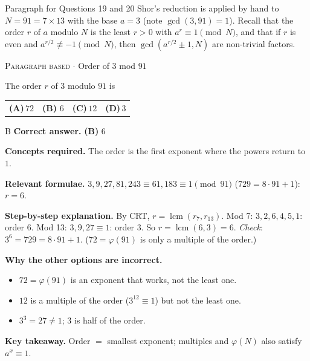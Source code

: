 \documentclass[11pt,a4paper]{article}
\newcommand{\optlabel}[1]{\textbf{(#1)}}
\newcommand{\correctlabel}[1]{\textcolor{okgreen}{\textbf{(#1)}\,\ding{51}}}
\newenvironment{qitem}[1]{\begin{list}{}{\setlength{\leftmargin}{3.3em}\setlength{\labelwidth}{3.1em}%
  \setlength{\labelsep}{0.2em}\setlength{\topsep}{3pt}\setlength{\parsep}{3pt}}\item[\textbf{Q.#1}\hfill]}{\end{list}}
\newcommand{\qsep}{\par\vspace{2pt}{\color{black!15}\hrule}\vspace{4pt}}
\newcommand{\qmeta}[2]{{\footnotesize\color{black!60}\textsc{#1} \;$\cdot$\; #2}\par}
\begin{document}
\begin{passagebox}{Paragraph for Questions 19 and 20}
Shor's reduction is applied by hand to $N = 91 = 7\times13$ with the base $a = 3$ (note $\gcd(3, 91) = 1$). Recall that the
order $r$ of $a$ modulo $N$ is the least $r > 0$ with $a^r \equiv 1 \pmod N$, and that if $r$ is even and $a^{r/2} \not\equiv -1 \pmod N$,
then $\gcd(a^{r/2} \pm 1, N)$ are non-trivial factors.
\end{passagebox}
\begin{qitem}{19}
\qmeta{Paragraph based}{Order of $3$ mod $91$}
The order $r$ of $3$ modulo $91$ is
\par\smallskip\noindent\begin{tabularx}{\linewidth}{@{}*{4}{L}@{}}
\optlabel{A}\,$72$ & \correctlabel{B}\,$6$ & \optlabel{C}\,$12$ & \optlabel{D}\,$3$
\end{tabularx}
\end{qitem}
\begin{solbox}{B}
\textbf{\color{brand}Correct answer.} \textcolor{okgreen}{\textbf{(B)}} $6$

\textbf{\color{brand}Concepts required.} The order is the first exponent where the powers return to $1$.

\textbf{\color{brand}Relevant formulae.} $3, 9, 27, 81, 243 \equiv 61, 183 \equiv 1 \pmod{91}$ ($729 = 8\cdot91 + 1$): $r = 6$.

\textbf{\color{brand}Step-by-step explanation.} By CRT, $r = \operatorname{lcm}(r_7, r_{13})$. Mod 7: $3, 2, 6, 4, 5, 1$: order $6$. Mod 13: $3, 9, 27 \equiv 1$: order $3$. So $r = \operatorname{lcm}(6, 3) = 6$.
\emph{Check}: $3^6 = 729 = 8\cdot91 + 1$. ($72 = \varphi(91)$ is only a multiple of the order.)

\textbf{\color{brand}Why the other options are incorrect.}
\begin{itemize}[leftmargin=2.4em, itemsep=1pt, topsep=2pt]
\item[\textbf{(A)}] $72 = \varphi(91)$ is an exponent that works, not the least one.
\item[\textbf{(C)}] $12$ is a multiple of the order ($3^{12} \equiv 1$) but not the least one.
\item[\textbf{(D)}] $3^3 = 27 \ne 1$; $3$ is half of the order.
\end{itemize}
\textbf{\color{brand}Key takeaway.} Order $=$ smallest exponent; multiples and $\varphi(N)$ also satisfy $a^x \equiv 1$.
\end{solbox}
\qsep
\end{document}
